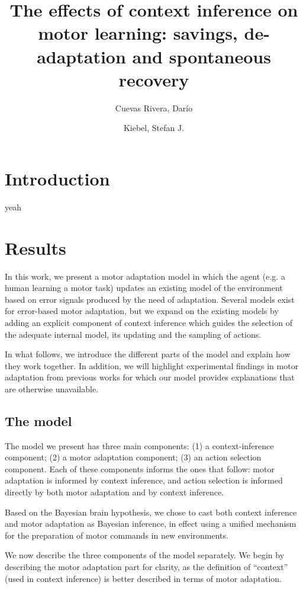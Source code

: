\documentclass[a4paper,doc,floatsintext,natbib]{apa6}
\title{The effects of context inference on motor learning: savings, de-adaptation and spontaneous recovery}
\author[1]{Cuevas Rivera, Darío}
\author[1]{Kiebel, Stefan J.}
\affil[1]{Chair of Neuroimaging, Faculty of Psychology. Technische Universität Dresden, 01062 Dresden, Germany.}
\affiliation{~}
\begin{document}
\maketitle


\section{Introduction}
yeah

\section{Results}
In this work, we present a motor adaptation model in which the agent (e.g. a human learning a motor task) updates an existing model of the environment based on error signals produced by the need of adaptation. Several models exist for error-based motor adaptation, but we expand on the existing models by adding an explicit component of context inference which guides the selection of the adequate internal model, its updating and the sampling of actions.

In what follows, we introduce the different parts of the model and explain how they work together. In addition, we will highlight experimental findings in motor adaptation from previous works for which our model provides explanations that are otherwise unavailable.

\subsection{The model}
The model we present has three main components: (1) a context-inference component; (2) a motor adaptation component; (3) an action selection component. Each of these components informs the ones that follow: motor adaptation is informed by context inference, and action selection is informed directly by both motor adaptation and by context inference.

Based on the Bayesian brain hypothesis, we chose to cast both context inference and motor adaptation as Bayesian inference, in effect using a unified mechanism for the preparation of motor commands in new environments.

We now describe the three components of the model separately. We begin by describing the motor adaptation part for clarity, as the definition of ``context'' (used in context inference) is better described in terms of motor adaptation.
\end{document}
